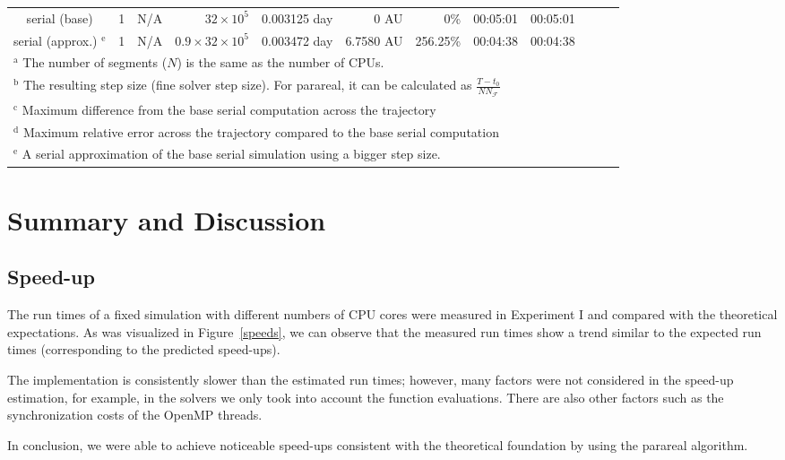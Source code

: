 \documentclass[conference]{IEEEtran}
\begin{document}
\begin{table*}[htbp]
\begin{center}
\begin{tabular}{crrrrrrrrrcc}
serial (base) & 1 & N/A & $32\times10^5$ & 0.003125 day & 0 AU & 0\% & 00:05:01 & 00:05:01 \\
serial (approx.) $^{\mathrm{e}}$ & 1 & N/A & $0.9\times32\times10^5$ & 0.003472 day & 6.7580 AU & 256.25\% & 00:04:38 & 00:04:38 \\
\bottomrule
\multicolumn{8}{l}{$^{\mathrm{a}}$ The number of segments ($N$) is the same as the number of CPUs.} \\
\multicolumn{8}{l}{$^{\mathrm{b}}$ The resulting step size (fine solver step size). For parareal, it can be calculated as $\frac{T-t_0}{NN_\mathcal{F}}$} \\
\multicolumn{8}{l}{$^{\mathrm{c}}$ Maximum difference from the base serial computation across the trajectory} \\
\multicolumn{8}{l}{$^{\mathrm{d}}$ Maximum relative error across the trajectory compared to the base serial computation} \\
\multicolumn{8}{l}{$^{\mathrm{e}}$ A serial approximation of the base serial simulation using a bigger step size.}
\end{tabular}
\label{runtimes}
\end{center}
\end{table*}

\section{Summary and Discussion}

\subsection{Speed-up}
The run times of a fixed simulation with different numbers of CPU cores were measured in Experiment I and compared with the theoretical expectations. As was visualized in Figure~\ref{speeds}, we can observe that the measured run times show a trend similar to the expected run times (corresponding to the predicted speed-ups). 

The implementation is consistently slower than the estimated run times; however, many factors were not considered in the speed-up estimation, for example, in the solvers we only took into account the function evaluations. There are also other factors such as the synchronization costs of the OpenMP threads.

In conclusion, we were able to achieve noticeable speed-ups consistent with the theoretical foundation by using the parareal algorithm.
\end{document}
